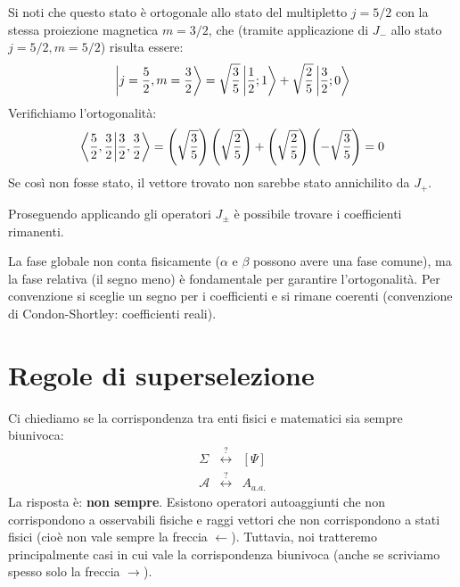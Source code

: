 \begin{remark}
    Si noti che questo stato è ortogonale allo stato del multipletto $j=5/2$ con la stessa proiezione magnetica $m=3/2$, che (tramite applicazione di $J_-$ allo stato $j=5/2, m=5/2$) risulta essere:
    \[
        \ket{j=\frac{5}{2}, m=\frac{3}{2}} = \sqrt{\frac{3}{5}} \ket{\frac{1}{2}; 1} + \sqrt{\frac{2}{5}} \ket{\frac{3}{2}; 0}
    \]
    Verifichiamo l'ortogonalità:
    \[
        \braket{\frac{5}{2}, \frac{3}{2}}{\frac{3}{2}, \frac{3}{2}} = \left(\sqrt{\frac{3}{5}}\right)\left(\sqrt{\frac{2}{5}}\right) + \left(\sqrt{\frac{2}{5}}\right)\left(-\sqrt{\frac{3}{5}}\right) = 0
    \]
    Se così non fosse stato, il vettore trovato non sarebbe stato annichilito da $J_+$.
\end{remark}
Proseguendo applicando gli operatori \(J_\pm \) è possibile trovare i coefficienti rimanenti.
\begin{remark}
    La fase globale non conta fisicamente ($\alpha$ e $\beta$ possono avere una fase comune), ma la fase relativa (il segno meno) è fondamentale per garantire l'ortogonalità. Per convenzione si sceglie un segno per i coefficienti e si rimane coerenti (convenzione di Condon-Shortley: coefficienti reali).
\end{remark}

\section{Regole di superselezione}

Ci chiediamo se la corrispondenza tra enti fisici e matematici sia sempre biunivoca:
\[
    \begin{matrix}
        \Sigma & \overset{?}{\longleftrightarrow} & [\Psi] \\
        \mathcal{A} & \overset{?}{\longleftrightarrow} & A_{a.a.}
    \end{matrix}
\]
La risposta è: \textbf{non sempre}.
Esistono operatori autoaggiunti che non corrispondono a osservabili fisiche e raggi vettori che non corrispondono a stati fisici (cioè non vale sempre la freccia $\leftarrow$).
Tuttavia, noi tratteremo principalmente casi in cui vale la corrispondenza biunivoca (anche se scriviamo spesso solo la freccia $\to$).


